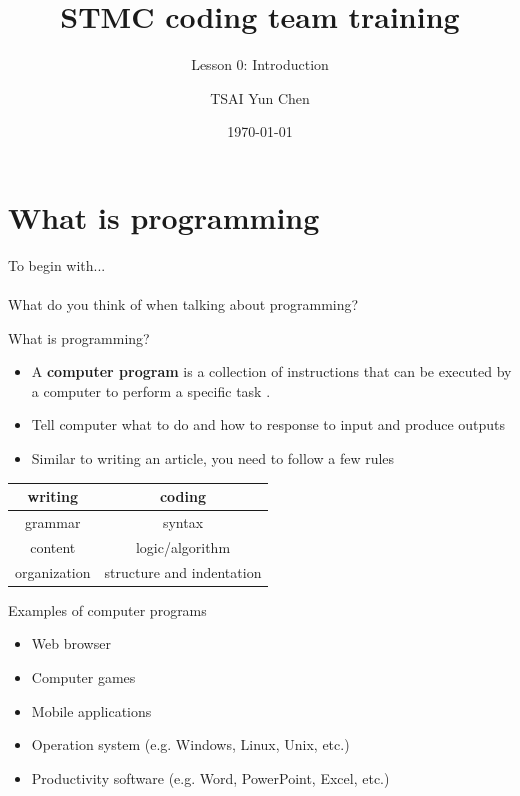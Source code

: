 \documentclass[10pt,xcolor={table,dvipsnames},t]{beamer}
\title[Your Short Title]{STMC coding team training}
\subtitle{Lesson 0: Introduction}
\author{TSAI Yun Chen}
\date{\today}
\begin{document}
\begin{frame}
  \titlepage
\end{frame}


\section{What is programming}

\begin{frame}{To begin with...\\\enspace\\ What do you think of when talking about programming?}
  
\end{frame}

\begin{frame}{What is programming?}

  \begin{itemize}
    \item A \textbf{computer program} is a collection of instructions that can be executed by a computer to perform a specific task \cite{enwiki:Computer_program}.
    \item Tell computer what to do and how to response to input and produce outputs
    \item Similar to writing an article, you need to follow a few rules
  \end{itemize}
  \begin{table}[h!]
    \centering
    \begin{tabular}{|c|c|}
      \hline
      writing&coding\\
      \hline
      grammar&syntax\\
      content&logic/algorithm\\
      organization&structure and indentation\\
      \hline
    \end{tabular}
  \end{table}

\end{frame}

\begin{frame}{Examples of computer programs}
  \begin{itemize}
    \item Web browser
    \item Computer games
    \item Mobile applications 
    \item Operation system (e.g. Windows, Linux, Unix, etc.)
    \item Productivity software (e.g. Word, PowerPoint, Excel, etc.)
  \end{itemize}
\end{frame}
\end{document}
